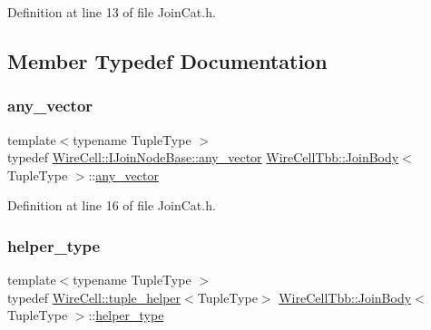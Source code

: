 Definition at line 13 of file Join\+Cat.\+h.



\subsection{Member Typedef Documentation}
\mbox{\label{class_wire_cell_tbb_1_1_join_body_adf37b78bb7d9d2dc64ca2ca36a8b5188}} 
\subsubsection{\texorpdfstring{any\+\_\+vector}{any\_vector}}
{\footnotesize\ttfamily template$<$typename Tuple\+Type $>$ \\
typedef \hyperlink{class_wire_cell_1_1_i_join_node_base_a5d53e0f00c30b472677c399c7d358fa3}{Wire\+Cell\+::\+I\+Join\+Node\+Base\+::any\+\_\+vector} \hyperlink{class_wire_cell_tbb_1_1_join_body}{Wire\+Cell\+Tbb\+::\+Join\+Body}$<$ Tuple\+Type $>$\+::\hyperlink{class_wire_cell_tbb_1_1_join_body_adf37b78bb7d9d2dc64ca2ca36a8b5188}{any\+\_\+vector}}



Definition at line 16 of file Join\+Cat.\+h.

\mbox{\label{class_wire_cell_tbb_1_1_join_body_a719b9c7b803cd01d97166a5c7a6907f6}} 
\subsubsection{\texorpdfstring{helper\+\_\+type}{helper\_type}}
{\footnotesize\ttfamily template$<$typename Tuple\+Type $>$ \\
typedef \hyperlink{struct_wire_cell_1_1tuple__helper}{Wire\+Cell\+::tuple\+\_\+helper}$<$Tuple\+Type$>$ \hyperlink{class_wire_cell_tbb_1_1_join_body}{Wire\+Cell\+Tbb\+::\+Join\+Body}$<$ Tuple\+Type $>$\+::\hyperlink{class_wire_cell_tbb_1_1_join_body_a719b9c7b803cd01d97166a5c7a6907f6}{helper\+\_\+type}}



